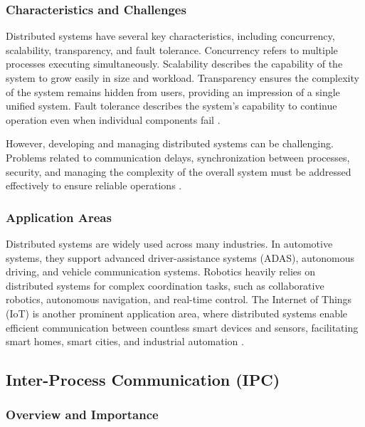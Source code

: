 \subsubsection{Characteristics and Challenges}

Distributed systems have several key characteristics, including concurrency, scalability, transparency, and fault tolerance. Concurrency refers to multiple processes executing simultaneously. Scalability describes the capability of the system to grow easily in size and workload. Transparency ensures the complexity of the system remains hidden from users, providing an impression of a single unified system. Fault tolerance describes the system's capability to continue operation even when individual components fail \cite{tanenbaum2017}.

\vspace{1em}
However, developing and managing distributed systems can be challenging. Problems related to communication delays, synchronization between processes, security, and managing the complexity of the overall system must be addressed effectively to ensure reliable operations \cite{coulouris2012}.

\subsubsection{Application Areas}

Distributed systems are widely used across many industries. In automotive systems, they support advanced driver-assistance systems (ADAS), autonomous driving, and vehicle communication systems. Robotics heavily relies on distributed systems for complex coordination tasks, such as collaborative robotics, autonomous navigation, and real-time control. The Internet of Things (IoT) is another prominent application area, where distributed systems enable efficient communication between countless smart devices and sensors, facilitating smart homes, smart cities, and industrial automation \cite{tanenbaum2017,coulouris2012}.



\subsection{Inter-Process Communication (IPC)}

\subsubsection{Overview and Importance}

